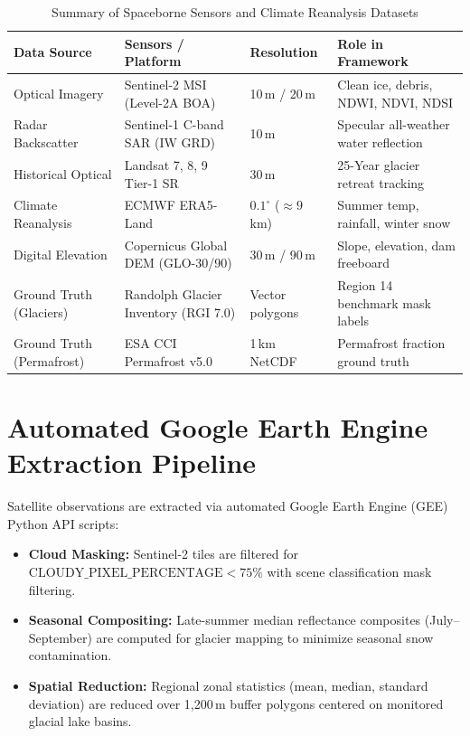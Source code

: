 \documentclass[12pt,a4paper]{report}
\begin{document}
\begin{table}[H]
\centering
\caption{Summary of Spaceborne Sensors and Climate Reanalysis Datasets}
\label{tab:sensor_specifications}
\small
\begin{tabularx}{\textwidth}{lXll}
\toprule
\textbf{Data Source} & \textbf{Sensors / Platform} & \textbf{Resolution} & \textbf{Role in Framework} \\
\midrule
Optical Imagery & Sentinel-2 MSI (Level-2A BOA) & 10\,m / 20\,m & Clean ice, debris, NDWI, NDVI, NDSI \\
Radar Backscatter & Sentinel-1 C-band SAR (IW GRD) & 10\,m & Specular all-weather water reflection \\
Historical Optical & Landsat 7, 8, 9 Tier-1 SR & 30\,m & 25-Year glacier retreat tracking \\
Climate Reanalysis & ECMWF ERA5-Land & $0.1^\circ$ ($\approx 9$\,km) & Summer temp, rainfall, winter snow \\
Digital Elevation & Copernicus Global DEM (GLO-30/90) & 30\,m / 90\,m & Slope, elevation, dam freeboard \\
Ground Truth (Glaciers) & Randolph Glacier Inventory (RGI 7.0) & Vector polygons & Region 14 benchmark mask labels \\
Ground Truth (Permafrost) & ESA CCI Permafrost v5.0 & 1\,km NetCDF & Permafrost fraction ground truth \\
\bottomrule
\end{tabularx}
\end{table}

\section{Automated Google Earth Engine Extraction Pipeline}
Satellite observations are extracted via automated Google Earth Engine (GEE) Python API scripts:
\begin{itemize}
    \item \textbf{Cloud Masking:} Sentinel-2 tiles are filtered for $\text{CLOUDY\_PIXEL\_PERCENTAGE} < 75\%$ with scene classification mask filtering.
    \item \textbf{Seasonal Compositing:} Late-summer median reflectance composites (July--September) are computed for glacier mapping to minimize seasonal snow contamination.
    \item \textbf{Spatial Reduction:} Regional zonal statistics (mean, median, standard deviation) are reduced over 1,200\,m buffer polygons centered on monitored glacial lake basins.
\end{itemize}
\end{document}
